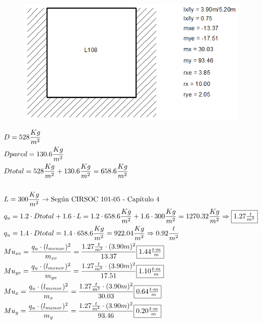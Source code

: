 \begin{enumerate}
\begin{itemize}
\begin{figure}[H]
\begin{center}
     \includegraphics[scale = 0.8]{chapters/chapter_1/images/l108_bis.png}
\end{center}
\end{figure}
\begin{align*}
& D = 528 \frac{Kg}{m^2}\\
& Dpared = 130.6 \frac{Kg}{m^2}\\
& Dtotal = 528 \frac{Kg}{m^2} + 130.6 \frac{Kg}{m^2} = 658.6 \frac{Kg}{m^2}\\\\
& L = 300 \frac{Kg}{m^2} \rightarrow \text{Según CIRSOC 101-05 - Capítulo 4}\\
& q_u = 1.2 \cdot Dtotal + 1.6 \cdot L = 1.2 \cdot 658.6 \frac{Kg}{m^2} + 1.6 \cdot 300 \frac{Kg}{m^2} = 1270.32 \frac{Kg}{m^2} \Rightarrow \framebox{$1.27 \frac{t}{m^2}$} \\
& q_u = 1.4 \cdot Dtotal = 1.4 \cdot 658.6 \frac{Kg}{m^2} = 922.04 \frac{Kg}{m^2} \Rightarrow 0.92 \frac{t}{m^2}\\
& Mu_{xe} = \frac{q_u \cdot (l_{menor})^2}{m_{xe}} = \frac{1.27 \frac{t}{m^2} \cdot (3.90m)^2}{13.37} \framebox{$1.44 \frac{t \cdot m}{m}$}\\
& Mu_{ye} = \frac{q_u \cdot (l_{menor})^2}{m_{ye}} = \frac{1.27 \frac{t}{m^2} \cdot (3.90m)^2}{17.51} \framebox{$1.10 \frac{t \cdot m}{m}$}\\
& Mu_x = \frac{q_u \cdot (l_{menor})^2}{m_{x}} = \frac{1.27 \frac{t}{m^2} \cdot (3.90m)^2}{30.03} \framebox{$0.64 \frac{t \cdot m}{m}$}\\
& Mu_y = \frac{q_u \cdot (l_{menor})^2}{m_{y}} = \frac{1.27 \frac{t}{m^2} \cdot (3.90m)^2}{93.46} \framebox{$0.20 \frac{t \cdot m}{m}$}
\end{align*}


\end{itemize}
\end{enumerate}
